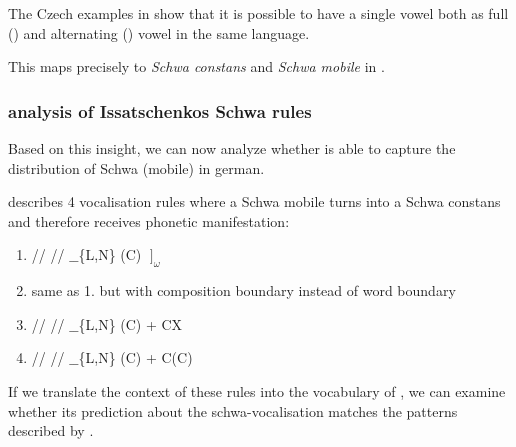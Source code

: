The Czech examples in  show that it is possible
to have a single vowel both as full () and alternating ()
vowel in the same language.

This maps precisely to \emph{Schwa constans} and \emph{Schwa mobile} in
\textcite{issatschenko1974}.

\subsubsection{\CVCV analysis of Issatschenkos Schwa rules}
Based on this insight, we can now analyze whether \CVCV is able to capture
the distribution of Schwa (mobile) in german.



\citeauthor{issatschenko1974} describes 4 vocalisation rules where
a Schwa mobile turns into a Schwa constans and therefore receives
phonetic manifestation:

\begin{enumerate}
  \item \deriv
    {/\schwaMobi/}    %
    {/\schwaCons/}    %
    {$\_\_$\{L,N\} (C) $\;\big]_\omega$}
  \item same as 1. but with composition boundary instead of word boundary
  \item \deriv
    {/\schwaMobi/}    %
    {/\schwaCons/}    %
    {$\_\_$\{L,N\} (C) + CX}
  \item \deriv
    {/\schwaMobi/}    %
    {/\schwaCons/}    %
    {$\_\_$\{L,N\} (C) + \schwaMobi C(C)}
\end{enumerate}

If we translate the context of these rules into the
vocabulary of \CVCV, we can examine whether its prediction
about the schwa-vocalisation matches the patterns
described by \citeauthor{issatschenko1974}.

